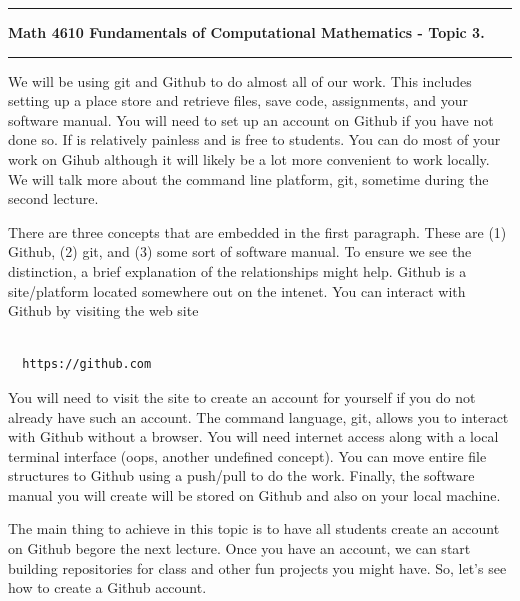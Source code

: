 \documentclass[10pt,fleqn]{article}
\begin{document}
\vskip0.1in\hrule\vskip0.1in
\noindent
{\bf Math 4610 Fundamentals of Computational Mathematics  - Topic 3.} 
\vskip0.1in\hrule\vskip0.1in
\noindent
We will be using git and Github to do almost all of our work. This includes
setting up a place store and retrieve files, save code, assignments, and your
software manual. You will need to set up an account on Github if you have not
done so. If is relatively painless and is free to students. You can do most of
your work on Gihub although it will likely be a lot more convenient to work
locally. We will talk more about the command line platform, git, sometime
during the second lecture.

\noindent
There are three concepts that are embedded in the first paragraph. These are
(1) Github, (2) git, and (3) some sort of software manual. To ensure we see
the distinction, a brief explanation of the relationships might help. Github
is a site/platform located somewhere out on the intenet. You can interact with
Github by visiting the web site
\begin{verbatim}

  https://github.com

\end{verbatim}
You will need to visit the site to create an account for yourself if you do not
already have such an account. The command language, git, allows you to interact
with Github without a browser. You will need internet access along with a local
terminal interface (oops, another undefined concept). You can move entire file
structures to Github using a push/pull to do the work. Finally, the software
manual you will create will be stored on Github and also on your local machine.

The main thing to achieve in this topic is to have all students create an 
account on Github begore the next lecture. Once you have an account, we can
start building repositories for class and other fun projects you might have. So,
let's see how to create a Github account.
\end{document}
